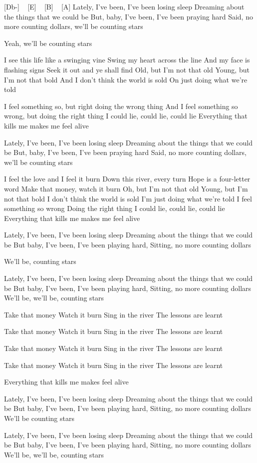 [Db-] ~ [E] ~ [B] ~ [A]
Lately, I've been, I've been losing sleep
Dreaming about the things that we could be
But, baby, I've been, I've been praying hard
Said, no more counting dollars, we'll be counting stars

Yeah, we'll be counting stars

I see this life like a swinging vine
Swing my heart across the line
And my face is flashing signs
Seek it out and ye shall find
Old, but I'm not that old
Young, but I'm not that bold
And I don't think the world is sold
On just doing what we're told


I feel something so, but right doing the wrong thing
And I feel something so wrong, but doing the right thing
I could lie, could lie, could lie
Everything that kills me makes me feel alive

Lately, I've been, I've been losing sleep
Dreaming about the things that we could be
But, baby, I've been, I've been praying hard
Said, no more counting dollars, we'll be counting stars


I feel the love and I feel it burn
Down this river, every turn
Hope is a four-letter word
Make that money, watch it burn
Oh, but I'm not that old
Young, but I'm not that bold
I don't think the world is sold
I'm just doing what we're told
I feel something so wrong
Doing the right thing
I could lie, could lie, could lie
Everything that kills me makes me feel alive

Lately, I've been, I've been losing sleep
Dreaming about the things that we could be
But baby, I've been, I've been playing hard,
Sitting, no more counting dollars

We'll be, counting stars

Lately, I've been, I've been losing sleep
Dreaming about the things that we could be
But baby, I've been, I've been playing hard,
Sitting, no more counting dollars
We'll be, we'll be, counting stars

Take that money
Watch it burn
Sing in the river
The lessons are learnt

Take that money
Watch it burn
Sing in the river
The lessons are learnt


Take that money
Watch it burn
Sing in the river
The lessons are learnt

Take that money
Watch it burn
Sing in the river
The lessons are learnt

Everything that kills me makes feel alive

Lately, I've been, I've been losing sleep
Dreaming about the things that we could be
But baby, I've been, I've been playing hard,
Sitting, no more counting dollars
We'll be counting stars


Lately, I've been, I've been losing sleep
Dreaming about the things that we could be
But baby, I've been, I've been playing hard,
Sitting, no more counting dollars
We'll be, we'll be, counting stars

